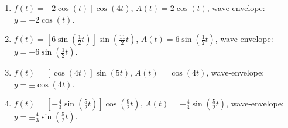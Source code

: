 \documentclass{ximera}
\begin{document}
\begin{enumerate}

\setcounter{enumi}{\value{HW}}

\item $f(t) = [2\cos(t)] \cos(4t)$, $A(t) = 2\cos(t)$, wave-envelope:  $y = \pm 2\cos(t)$.
\item $f(t) = \left[6\sin \left( \frac{1}{2} t \right) \right] \sin \left( \frac{11}{2} t \right) $, $A(t) = 6\sin \left( \frac{1}{2} t \right) $, wave-envelope:  $y = \pm  6\sin \left( \frac{1}{2} t \right)$.
\item $f(t) = [\cos(4t)] \sin(5t)$, $A(t) = \cos(4t)$, wave-envelope:  $y = \pm \cos(4t)$.
\item $f(t) =  \left[-\frac{4}{3}\sin \left( \frac{5}{2} t \right) \right]\cos \left( \frac{9}{2} t \right) $, $A(t) = -\frac{4}{3}\sin \left( \frac{5}{2} t \right)$, wave-envelope:  $y = \pm \frac{4}{3} \sin \left( \frac{5}{2} t \right)$.

\setcounter{HW}{\value{enumi}}

\end{enumerate}
\end{document}
